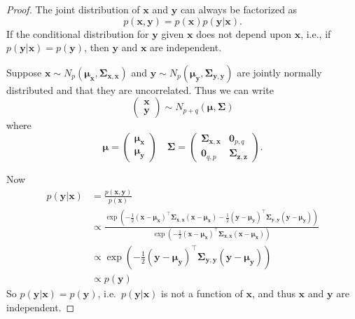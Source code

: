 \documentclass[
]{book}
\theoremstyle{definition}
\theoremstyle{definition}
\theoremstyle{definition}
\theoremstyle{definition}
\theoremstyle{remark}
\begin{document}
\begin{proof}
The joint distribution of \(\mathbf x\) and \(\mathbf y\) can always be factorized as
\[p(\mathbf x, \mathbf y)= p(\mathbf x)p(\mathbf y|\mathbf x).\]
If the conditional distribution for \(\mathbf y\) given \(\mathbf x\) does not depend upon \(\mathbf x\), i.e., if \(p(\mathbf y| \mathbf x)=p(\mathbf y)\), then \(\mathbf y\) and \(\mathbf x\) are independent.

Suppose \(\mathbf x\sim N_p({\boldsymbol{\mu}}_\mathbf x, \boldsymbol{\Sigma}_{\mathbf x,\mathbf x})\) and \(\mathbf y\sim N_p({\boldsymbol{\mu}}_\mathbf y, \boldsymbol{\Sigma}_{\mathbf y,\mathbf y})\) are jointly normally distributed and that they are uncorrelated. Thus we can write
\[\begin{pmatrix}\mathbf x\\ \mathbf y\end{pmatrix}\sim N_{p+q}\left({\boldsymbol{\mu}}, \boldsymbol{\Sigma}\right)
\]
where
\[{\boldsymbol{\mu}}= \begin{pmatrix}{\boldsymbol{\mu}}_\mathbf x\\ {\boldsymbol{\mu}}_{\mathbf y}\end{pmatrix}\quad \boldsymbol{\Sigma}= \begin{pmatrix} \boldsymbol{\Sigma}_{\mathbf x, \mathbf x} &\boldsymbol 0_{p,q}\\
\boldsymbol 0_{q,p} & \boldsymbol{\Sigma}_{\mathbf z, \mathbf z}\end{pmatrix}.\]

Now
\begin{align*}
p(\mathbf y|\mathbf x)&=\frac{p(\mathbf x, \mathbf y)}{p(\mathbf x)}\\
  &\propto \frac{\exp\left(-\frac{1}{2}(\mathbf x-{\boldsymbol{\mu}}_\mathbf x)^\top \boldsymbol{\Sigma}_{\mathbf x,\mathbf x}(\mathbf x-{\boldsymbol{\mu}}_\mathbf x) -\frac{1}{2}(\mathbf y-{\boldsymbol{\mu}}_\mathbf y)^\top \boldsymbol{\Sigma}_{\mathbf y,\mathbf y}(\mathbf y-{\boldsymbol{\mu}}_\mathbf y)\right)}{\exp\left(-\frac{1}{2}(\mathbf x-{\boldsymbol{\mu}}_\mathbf x)^\top \boldsymbol{\Sigma}_{\mathbf x,\mathbf x}(\mathbf x-{\boldsymbol{\mu}}_\mathbf x)\right)} \\
&\propto \exp\left(-\frac{1}{2}(\mathbf y-{\boldsymbol{\mu}}_\mathbf y)^\top \boldsymbol{\Sigma}_{\mathbf y,\mathbf y}(\mathbf y-{\boldsymbol{\mu}}_\mathbf y)\right) \\
&\propto p(\mathbf y)
\end{align*}
So \(p(\mathbf y|\mathbf x)=p(\mathbf y)\), i.e.~\(p(\mathbf y|\mathbf x)\) is not a function of \(\mathbf x\), and thus \(\mathbf x\) and \(\mathbf y\) are independent.
\end{proof}
\end{document}
